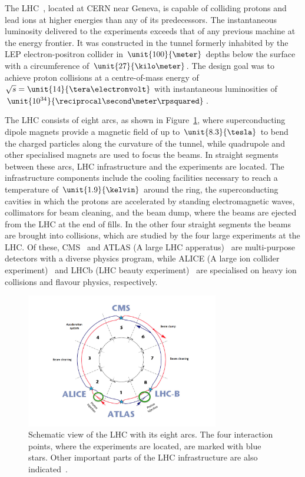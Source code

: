 \label{sec:LHC}
The LHC~\cite{LHC}, located at CERN near Geneva, is capable of colliding protons and lead ions at higher energies than any of its predecessors. The instantaneous luminosity delivered to the experiments exceeds that of any previous machine at the energy frontier. It was constructed in the tunnel formerly inhabited by the LEP electron-positron collider in $\unit{100}{\meter}$ depths below the surface with a circumference of $\unit{27}{\kilo\meter}$. The design goal was to achieve proton collisions at a centre-of-mass energy of $\sqrt{s} = \unit{14}{\tera\electronvolt}$ with instantaneous luminosities of $\unit{10^{34}}{\reciprocal\second\meter\rpsquared}$. 

The LHC consists of eight arcs, as shown in Figure~\ref{fig:LHC}, where superconducting dipole magnets provide a magnetic field of up to $\unit{8.3}{\tesla}$ to bend the charged particles along the curvature of the tunnel, while quadrupole and other specialised magnets are used to focus the beams. In straight segments between these arcs, LHC infrastructure and the experiments are located. The infrastructure components include the cooling facilities necessary to reach a temperature of $\unit{1.9}{\kelvin}$ around the ring, the superconducting cavities in which the protons are accelerated by standing electromagnetic waves, collimators for beam cleaning, and the beam dump, where the beams are ejected from the LHC at the end of fills. In the other four straight segments the beams are brought into collisions, which are studied by the four large experiments at the LHC. Of these, CMS~\cite{CMS} and ATLAS (A large LHC apperatus)~\cite{ATLAS} are multi-purpose detectors with a diverse physics program, while ALICE (A large ion collider experiment)~\cite{ALICE} and LHCb (LHC beauty experiment)~\cite{LHCb} are specialised on heavy ion collisions and flavour physics, respectively. 

\begin{figure}[htbp]
\centering
  \includegraphics[width=0.75\textwidth]{plots/LHC/LHC_scetch.png}
\caption{Schematic view of the LHC with its eight arcs. The four interaction points, where the experiments are located, are marked with blue stars. Other important parts of the LHC infrastructure are also indicated~\cite{LHCScetch}.}
\label{fig:LHC}
\end{figure}

